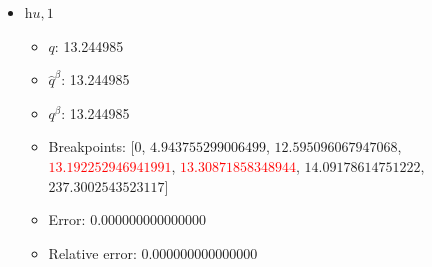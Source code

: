 \documentclass{article}%
\begin{document}
\begin{itemize}
\begin{itemize}
		\item Error: 0.000000000000000%
		\item Relative error: 0.000000000000000%
	\end{itemize}%
	\item $\textit{hu},1$%
	\begin{itemize}%
		\item $q$: 13.244985%
		\item $\hat{q}^\beta$: 13.244985%
		\item $q^\beta$: 13.244985%
		\item Breakpoints: $[$$0$, $4.943755299006499$, $12.595096067947068$, \textcolor{red}{$13.192252946941991$}, \textcolor{red}{$13.30871858348944$}, $14.09178614751222$, $237.3002543523117$$]$%
		\item Error: 0.000000000000000%
		\item Relative error: 0.000000000000000%
	\end{itemize}%
\end{itemize}%
\end{document}

